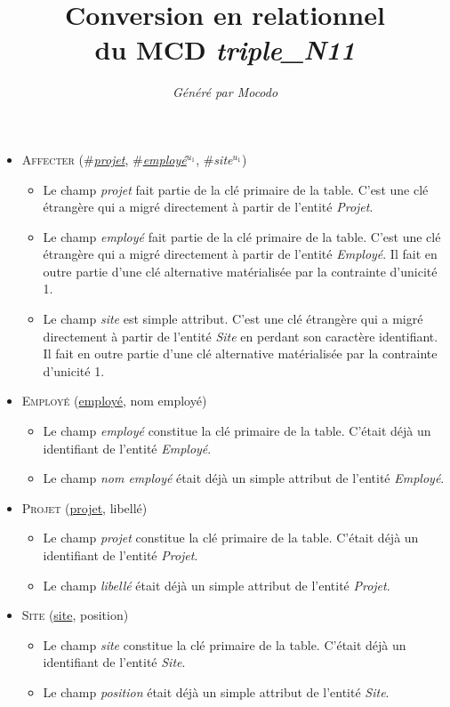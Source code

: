 \documentclass[a4paper]{article}
\title{Conversion en relationnel\\du MCD \emph{triple_N11}}
\author{\emph{Généré par Mocodo}}
\newcommand{\relat}[1]{\textsc{#1}}
\newcommand{\attr}[1]{#1}
\newcommand{\prim}[1]{\uline{#1}}
\newcommand{\foreign}[1]{\#\textsl{#1}}
\begin{document}
\maketitle

\begin{itemize}
  \item \relat{Affecter} (\foreign{\prim{projet}}, \foreign{\prim{employé}}$^{u_1}$, \foreign{site}$^{u_1}$)
  \begin{itemize}
    \item Le champ \emph{projet} fait partie de la clé primaire de la table. C'est une clé étrangère qui a migré directement à partir de l'entité \emph{Projet}.
    \item Le champ \emph{employé} fait partie de la clé primaire de la table. C'est une clé étrangère qui a migré directement à partir de l'entité \emph{Employé}. Il fait en outre partie d'une clé alternative matérialisée par la contrainte d'unicité 1.
    \item Le champ \emph{site} est simple attribut. C'est une clé étrangère qui a migré directement à partir de l'entité \emph{Site} en perdant son caractère identifiant. Il fait en outre partie d'une clé alternative matérialisée par la contrainte d'unicité 1.
  \end{itemize}

  \item \relat{Employé} (\prim{employé}, \attr{nom employé})
  \begin{itemize}
    \item Le champ \emph{employé} constitue la clé primaire de la table. C'était déjà un identifiant de l'entité \emph{Employé}.
    \item Le champ \emph{nom employé} était déjà un simple attribut de l'entité \emph{Employé}.
  \end{itemize}

  \item \relat{Projet} (\prim{projet}, \attr{libellé})
  \begin{itemize}
    \item Le champ \emph{projet} constitue la clé primaire de la table. C'était déjà un identifiant de l'entité \emph{Projet}.
    \item Le champ \emph{libellé} était déjà un simple attribut de l'entité \emph{Projet}.
  \end{itemize}

  \item \relat{Site} (\prim{site}, \attr{position})
  \begin{itemize}
    \item Le champ \emph{site} constitue la clé primaire de la table. C'était déjà un identifiant de l'entité \emph{Site}.
    \item Le champ \emph{position} était déjà un simple attribut de l'entité \emph{Site}.
  \end{itemize}

\end{itemize}
\end{document}
